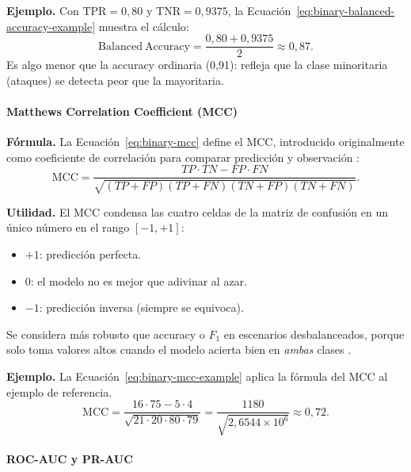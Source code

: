 \documentclass[12pt,oneside]{report}
\begin{document}
\textbf{Ejemplo.} Con $\mathrm{TPR}=0{,}80$ y $\mathrm{TNR}=0{,}9375$, la Ecuación~\eqref{eq:binary-balanced-accuracy-example} muestra el cálculo:
\begin{equation}
\label{eq:binary-balanced-accuracy-example}
\mathrm{Balanced\ Accuracy}=\frac{0{,}80+0{,}9375}{2}\approx 0{,}87.
\end{equation}
Es algo menor que la accuracy ordinaria (0{,}91): refleja que la clase
minoritaria (ataques) se detecta peor que la mayoritaria.

\paragraph{Matthews Correlation Coefficient (MCC)}

\textbf{Fórmula.} La Ecuación~\eqref{eq:binary-mcc} define el MCC, introducido originalmente como coeficiente de correlación para comparar predicción y observación \cite{matthews1975}:
\begin{equation}
\label{eq:binary-mcc}
\mathrm{MCC}=\frac{TP\cdot TN - FP\cdot FN}{\sqrt{(TP+FP)(TP+FN)(TN+FP)(TN+FN)}}.
\end{equation}

\textbf{Utilidad.} El MCC condensa las cuatro celdas de la matriz de
confusión en un único número en el rango $[-1,+1]$:
\begin{itemize}[leftmargin=*]
  \item $+1$: predicción perfecta.
  \item $0$: el modelo no es mejor que adivinar al azar.
  \item $-1$: predicción inversa (siempre se equivoca).
\end{itemize}
Se considera más robusto que accuracy o $F_1$ en escenarios
desbalanceados, porque solo toma valores altos cuando el modelo acierta
bien en \emph{ambas} clases \cite{chicco_mcc}.

\textbf{Ejemplo.} La Ecuación~\eqref{eq:binary-mcc-example} aplica la fórmula del MCC al ejemplo de referencia.
\begin{equation}
\label{eq:binary-mcc-example}
\mathrm{MCC}=\frac{16\cdot 75 - 5\cdot 4}{\sqrt{21\cdot 20\cdot 80\cdot 79}}
=\frac{1180}{\sqrt{2{,}6544\times 10^{6}}}\approx 0{,}72.
\end{equation}

\paragraph{ROC-AUC y PR-AUC}
\end{document}
